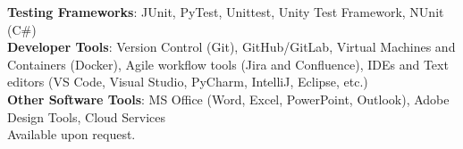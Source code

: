 \textbf{Testing Frameworks}: JUnit, 
PyTest, Unittest, Unity Test Framework, NUnit (C\#)\\
\textbf{Developer Tools}: Version Control (Git), 
GitHub/GitLab, Virtual Machines and Containers (Docker), 
Agile workflow tools (Jira and Confluence), IDEs and Text editors 
(VS Code, Visual Studio, PyCharm, IntelliJ, Eclipse, etc.)\\
\textbf{Other Software Tools}: 
MS Office (Word, Excel, PowerPoint, Outlook), 
Adobe Design Tools, Cloud Services \\ 
\newline
Available upon request.

